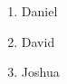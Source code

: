 \documentclass{article}
\begin{document}
	\begin{enumerate}
		\item Daniel
		\item David
		\item Joshua
	\end{enumerate}
\end{document}
